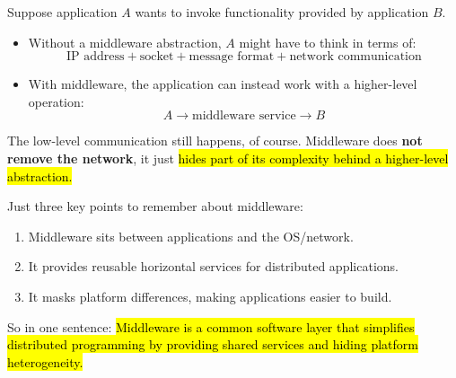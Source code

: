 \highspace
\begin{examplebox}
    Suppose application $A$ wants to invoke functionality provided by application $B$.
    \begin{itemize}
        \item[\textcolor{Red2}{\faIcon{times}}] Without a middleware abstraction, $A$ might have to think in terms of:
            \begin{equation*}
                \text{IP address}
                +
                \text{socket}
                +
                \text{message format}
                +
                \text{network communication}
            \end{equation*}

        \item[\textcolor{Green3}{\faIcon{check}}] With middleware, the application can instead work with a higher-level operation:
            \begin{equation*}
                A
                \rightarrow
                \boxed{\text{middleware service}}
                \rightarrow
                B
            \end{equation*}
    \end{itemize}
    The low-level communication still happens, of course. Middleware does \textbf{not remove the network}, it just \hl{hides part of its complexity behind a higher-level abstraction.}
\end{examplebox}

\highspace
\begin{takeawaysbox}
    Just three key points to remember about middleware:
    \begin{enumerate}
        \item Middleware sits between applications and the OS/network.
        \item It provides reusable horizontal services for distributed applications.
        \item It masks platform differences, making applications easier to build.
    \end{enumerate}
    So in one sentence: \hl{Middleware is a common software layer that simplifies distributed programming by providing shared services and hiding platform heterogeneity.}
\end{takeawaysbox}
